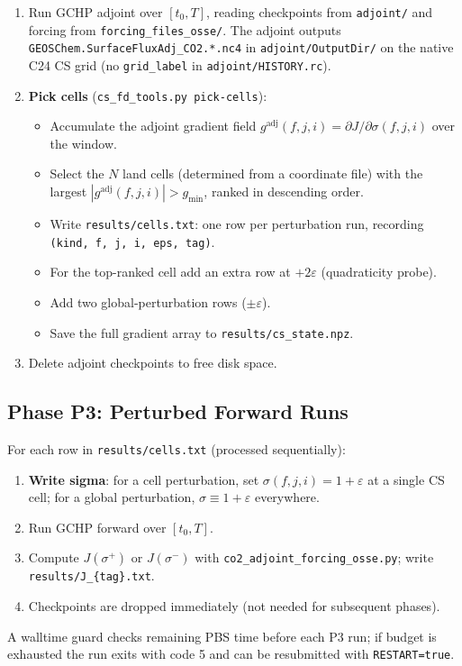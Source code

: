 \documentclass[12pt]{article}
\newcommand{\gadj}{g^{\mathrm{adj}}}
\newcommand{\eps}{\varepsilon}
\begin{document}
\begin{enumerate}
  \item Run GCHP adjoint over $[t_0, T]$, reading checkpoints from
        \texttt{adjoint/} and forcing from \texttt{forcing\_files\_osse/}.
        The adjoint outputs \texttt{GEOSChem.SurfaceFluxAdj\_CO2.*.nc4}
        in \texttt{adjoint/OutputDir/} on the native C24 CS grid (no
        \texttt{grid\_label} in \texttt{adjoint/HISTORY.rc}).
  \item \textbf{Pick cells} (\texttt{cs\_fd\_tools.py pick-cells}):
        \begin{itemize}
          \item Accumulate the adjoint gradient field
                $\gadj(f,j,i) = \partial J / \partial \sigma(f,j,i)$
                over the window.
          \item Select the $N$ land cells
                (determined from a coordinate file) with the largest
                $|\gadj(f,j,i)| > g_{\min}$, ranked in descending order.
          \item Write \texttt{results/cells.txt}: one row per perturbation run,
                recording \texttt{(kind, f, j, i, eps, tag)}.
          \item For the top-ranked cell add an extra row at $+2\eps$
                (quadraticity probe).
          \item Add two global-perturbation rows ($\pm\eps$).
          \item Save the full gradient array to
                \texttt{results/cs\_state.npz}.
        \end{itemize}
  \item Delete adjoint checkpoints to free disk space.
\end{enumerate}

\subsection{Phase P3: Perturbed Forward Runs}

For each row in \texttt{results/cells.txt} (processed sequentially):
\begin{enumerate}
  \item \textbf{Write sigma}: for a cell perturbation, set
        $\sigma(f,j,i) = 1 + \eps$ at a single CS cell; for a global
        perturbation, $\sigma \equiv 1 + \eps$ everywhere.
  \item Run GCHP forward over $[t_0, T]$.
  \item Compute $J(\sigma^{+})$ or $J(\sigma^{-})$ with
        \texttt{co2\_adjoint\_forcing\_osse.py}; write
        \texttt{results/J\_\{tag\}.txt}.
  \item Checkpoints are dropped immediately (not needed for subsequent
        phases).
\end{enumerate}
A walltime guard checks remaining PBS time before each P3 run; if budget
is exhausted the run exits with code 5 and can be resubmitted with
\texttt{RESTART=true}.
\end{document}
